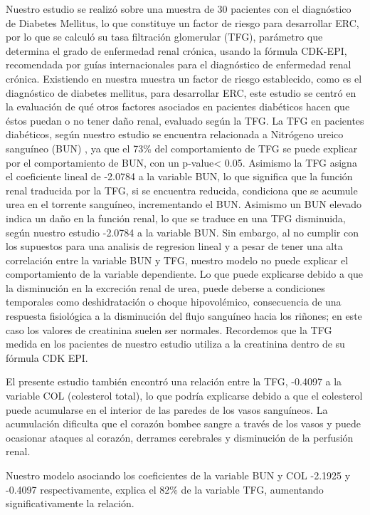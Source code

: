 \documentclass[runningheads,a4paper]{llncs}
\begin{document}
Nuestro estudio se realizó sobre una muestra de 30 pacientes con el diagnóstico de Diabetes Mellitus, lo que constituye un factor de riesgo para desarrollar ERC, por lo que se calculó su tasa filtración glomerular (TFG), parámetro que determina el grado de enfermedad renal crónica, usando la fórmula CDK-EPI, recomendada por guías internacionales para el diagnóstico de enfermedad renal crónica. 
Existiendo en nuestra muestra un factor de riesgo establecido, como es el diagnóstico de diabetes mellitus, para desarrollar ERC, este estudio se centró en la evaluación de qué otros factores asociados en pacientes diabéticos hacen que éstos puedan o no tener daño renal, evaluado según la TFG.
La  TFG en pacientes diabéticos, según nuestro estudio se encuentra relacionada a Nitrógeno ureico sanguíneo (BUN) , ya que el 73\% del comportamiento de TFG se puede explicar por el comportamiento de BUN, con un p-value< 0.05. Asimismo la TFG asigna el coeficiente lineal de -2.0784 a la variable BUN, lo que significa que la función renal traducida por la TFG, si se  encuentra reducida, condiciona que se acumule urea en el torrente sanguíneo, incrementando el BUN. Asimismo un BUN elevado  indica un daño en la función renal, lo que se traduce en una TFG disminuida, según nuestro estudio -2.0784 a la variable BUN. Sin embargo, al no cumplir con los supuestos para una analisis de regresion lineal y a pesar de tener una alta correlación entre la variable BUN y TFG, nuestro modelo no puede explicar el comportamiento de la variable dependiente. Lo que puede explicarse debido a que la disminución en la excreción renal de urea, puede deberse a condiciones temporales como deshidratación o choque hipovolémico, consecuencia de una respuesta fisiológica a la disminución del flujo sanguíneo hacia los riñones; en este caso los valores de creatinina suelen ser normales. Recordemos que la TFG medida en los pacientes de nuestro estudio utiliza a la creatinina dentro de su fórmula CDK EPI.

El presente estudio también encontró una relación entre la TFG,  -0.4097 a la variable COL (colesterol total), lo que podría explicarse debido a que el colesterol puede acumularse en el interior de las paredes de los vasos sanguíneos. La acumulación dificulta que el corazón bombee sangre a través de los vasos y puede ocasionar ataques al corazón, derrames cerebrales y disminución de la perfusión renal. 

Nuestro modelo asociando los coeficientes de la variable BUN y COL -2.1925 y -0.4097 respectivamente, explica el 82\% de la variable TFG, aumentando significativamente la relación.
\end{document}
